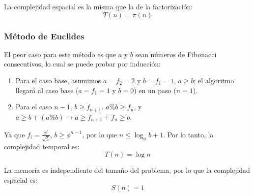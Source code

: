 La complejidad espacial es la misma que la de la factorización:
\begin{equation}
    T(n) = \pi(n)
\end{equation}

\subsubsection{Método de Euclides}

El peor caso para este método es que $a$ y $b$ sean números de Fibonacci consecutivos, lo cual se puede probar por inducción:

\begin{enumerate}
    \item Para el caso base, asumimos $a = f_2 =2$ y $b = f_1 = 1$, $a \geq b$; el algoritmo llegará al caso base ($a = f_1 = 1$ y $b = 0$) en un paso ($n = 1$).
    \item Para el caso $n-1$, $b\geq f_{n+1}$. $a\%b \geq f_n$, y $a \geq b + (a \% b) \rightarrow a \geq f_{n+1} + f_n \geq b$.
\end{enumerate}

Ya que $f_i = \frac{\phi^{i}}{\sqrt{5}}$, $b \geq \phi^{n-1}$, por lo que $n \leq \log_{\phi}{b+1}$. Por lo tanto, la complejidad temporal es:
\begin{equation}
    T(n) = \log{n}
\end{equation}

La memoria es independiente del tamaño del problema, por lo que la complejidad espacial es:
\begin{equation}
    S(n) = 1
\end{equation}